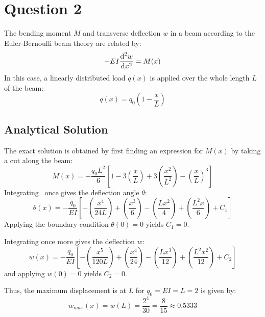 \section{Question 2}
The bending moment $M$ and transverse deflection $w$ in a beam according to the
Euler-Bernoulli beam theory are related by:
\begin{equation}
    \label{eq:governbeam}
    -EI \frac{\text{d}^2 w}{\text{d}x^2} = M(x)
\end{equation}
In this case, a linearly distributed load $q(x)$ is applied over the whole length
$L$ of the beam:
\begin{equation}
    q(x) = q_0 \left(1 - \frac{x}{L}\right)
\end{equation}

\subsection{Analytical Solution}
The exact solution is obtained by first finding an expression for $M(x)$ by
taking a cut along the beam:
\newcommand{\pfrac}[2]{\ensuremath{ \left( \frac{#1}{#2} \right) }}
$$
    M(x) = -\frac{q_0 L^2}{6}\left[
        1 - 3\pfrac{x}{L} + 3\pfrac{x^2}{L^2} - \pfrac{x}{L}^3
    \right]
$$
Integrating~ once gives the deflection angle $\theta$:
$$
    \theta(x) = -\frac{q_0}{E I} \left[
        -\pfrac{x^4}{24L} + \pfrac{x^3}{6} - \pfrac{L x^2}{4} + \pfrac{L^2 x}{6} + C_1
    \right]
$$
Applying the boundary condition $\theta(0) = 0$ yields $C_1 = 0$.

Integrating once more gives the deflection $w$:
$$
    w(x) = -\frac{q_0}{EI} \left[
        -\pfrac{x^5}{120 L} + \pfrac{x^4}{24} - \pfrac{L x^3}{12} + \pfrac{L^2 x^2}{12}
        + C_2
    \right]
$$
and applying $w(0) = 0$ yields $C_2 = 0$.

Thus, the maximum displacement is at $L$ for $q_0 = EI = L = 2$ is given by:
$$
    w_{max}(x) = w(L) = \frac{2^4}{30} = \frac{8}{15} \approx 0.5333
$$

